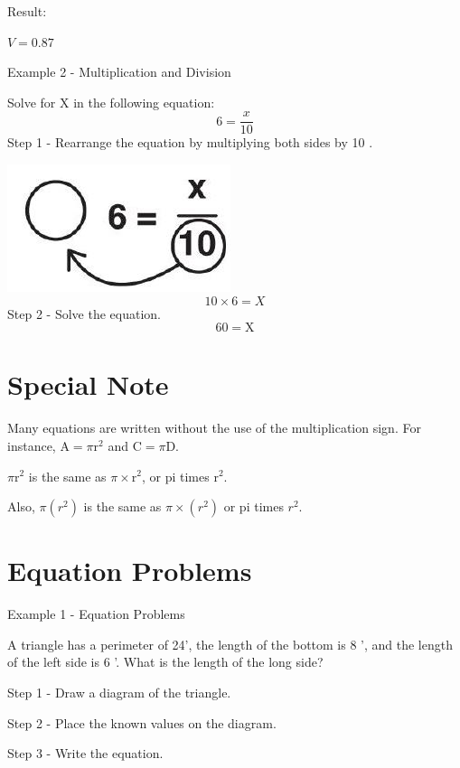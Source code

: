 \documentclass[10pt]{article}
\begin{document}
Result:

$V=0.87$

Example 2 - Multiplication and Division

Solve for $\mathrm{X}$ in the following equation:
$$
6=\frac{x}{10}
$$
Step 1 - Rearrange the equation by multiplying both sides by 10 .

\includegraphics[max width=\textwidth]{2022_09_11_72dbedc910e6e984560cg-19(1)}
$$
10 \times 6=X
$$
Step 2 - Solve the equation.
$$
60=\mathrm{X}
$$

\section{Special Note}
Many equations are written without the use of the multiplication sign. For instance, $\mathrm{A}=\pi \mathrm{r}^{2}$ and $\mathrm{C}=\pi \mathrm{D}$.

$\pi \mathrm{r}^{2}$ is the same as $\pi \times \mathrm{r}^{2}$, or pi times $\mathrm{r}^{2}$.

Also, $\pi\left(r^{2}\right)$ is the same as $\pi \times\left(r^{2}\right)$ or pi times $r^{2}$.

\section{Equation Problems}
Example 1 - Equation Problems

A triangle has a perimeter of 24', the length of the bottom is 8 ', and the length of the left side is 6 '. What is the length of the long side?

Step 1 - Draw a diagram of the triangle.

Step 2 - Place the known values on the diagram.

Step 3 - Write the equation.
\end{document}
